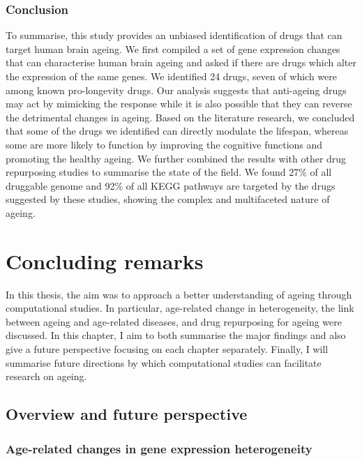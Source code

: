 \documentclass[12pt,twoside]{unicam}
\begin{document}
\hypertarget{conclusion-2}{%
\subsection{Conclusion}\label{conclusion-2}}

To summarise, this study provides an unbiased identification of drugs that can target human brain ageing. We first compiled a set of gene expression changes that can characterise human brain ageing and asked if there are drugs which alter the expression of the same genes. We identified 24 drugs, seven of which were among known pro-longevity drugs. Our analysis suggests that anti-ageing drugs may act by mimicking the response while it is also possible that they can reverse the detrimental changes in ageing. Based on the literature research, we concluded that some of the drugs we identified can directly modulate the lifespan, whereas some are more likely to function by improving the cognitive functions and promoting the healthy ageing. We further combined the results with other drug repurposing studies to summarise the state of the field. We found 27\% of all druggable genome and 92\% of all KEGG pathways are targeted by the drugs suggested by these studies, showing the complex and multifaceted nature of ageing.

\hypertarget{concludingRemarks}{%
\chapter{Concluding remarks}\label{concludingRemarks}}

In this thesis, the aim was to approach a better understanding of ageing through computational studies. In particular, age-related change in heterogeneity, the link between ageing and age-related diseases, and drug repurposing for ageing were discussed. In this chapter, I aim to both summarise the major findings and also give a future perspective focusing on each chapter separately. Finally, I will summarise future directions by which computational studies can facilitate research on ageing.

\hypertarget{overview-and-future-perspective}{%
\section{Overview and future perspective}\label{overview-and-future-perspective}}

\hypertarget{age-related-changes-in-gene-expression-heterogeneity}{%
\subsection{Age-related changes in gene expression heterogeneity}\label{age-related-changes-in-gene-expression-heterogeneity}}
\end{document}
